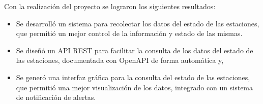 Con la realización del proyecto se lograron los siguientes resultados:





\begin{itemize}
   \item Se desarrolló un sistema para recolectar los datos del estado de las estaciones, que permitió un mejor control de la información y estado de las mismas.

   \item Se diseñó un API REST para facilitar la consulta de los datos del estado de las estaciones, documentada con OpenAPI de forma automática y,


   \item Se generó una interfaz gráfica para la consulta del estado de las estaciones, que permitió una mejor visualización de los datos, integrado con un sistema de notificación de alertas.


\end{itemize}



